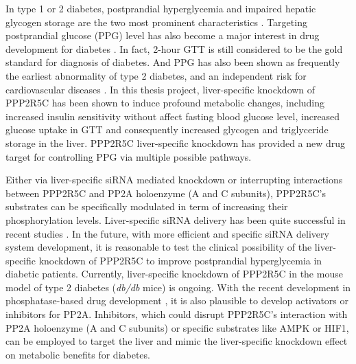 In type 1 or 2 diabetes, postprandial hyperglycemia and impaired hepatic glycogen storage are the two most prominent characteristics \cite{moore_regulation_2012}. Targeting postprandial glucose (PPG) level has also become a major interest in drug development for diabetes \cite{schrot_targeting_2004}. In fact, 2-hour GTT is still considered to be the gold standard for diagnosis of diabetes. And PPG has also been shown as frequently the earliest abnormality of type 2 diabetes, and an independent risk for cardiovascular diseases \cite{soonthornpun_postprandial_1999}. In this thesis project, liver-specific knockdown of PPP2R5C has been shown to induce profound metabolic changes, including increased insulin sensitivity without affect fasting blood glucose level, increased glucose uptake in GTT and consequently increased glycogen and triglyceride storage in the liver. PPP2R5C liver-specific knockdown has provided a new drug target for controlling PPG via multiple possible pathways. 

Either via liver-specific siRNA mediated knockdown or interrupting interactions between PPP2R5C and PP2A holoenzyme (A and C subunits), PPP2R5C's substrates can be specifically modulated in term of increasing their phosphorylation levels. Liver-specific siRNA delivery has been quite successful in recent studies \cite{wooddell_hepatocyte-targeted_2013,hattori_vivo_2014}. In the future, with more efficient and specific siRNA delivery system development, it is reasonable to test the clinical possibility of the liver-specific knockdown of PPP2R5C to improve postprandial hyperglycemia in diabetic patients. Currently, liver-specific knockdown of PPP2R5C in the mouse model of type 2 diabetes (\textit{db/db} mice) is ongoing. With the recent development in phosphatase-based drug development \cite{chatterjee_targeting_2013}, it is also plausible to develop activators or inhibitors for PP2A. Inhibitors, which could disrupt PPP2R5C's interaction with PP2A holoenzyme (A and C subunits) or specific substrates like AMPK or HIF1\textalpha{}, can be employed to target the liver and mimic the liver-specific knockdown effect on metabolic benefits for diabetes.





